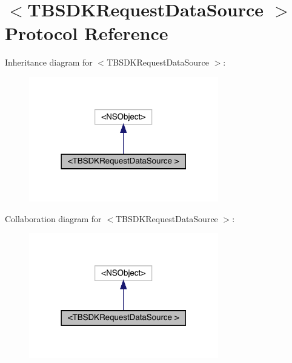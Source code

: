 \hypertarget{protocol_t_b_s_d_k_request_data_source_01-p}{}\section{$<$T\+B\+S\+D\+K\+Request\+Data\+Source $>$ Protocol Reference}
\label{protocol_t_b_s_d_k_request_data_source_01-p}


Inheritance diagram for $<$T\+B\+S\+D\+K\+Request\+Data\+Source $>$\+:\nopagebreak
\begin{figure}[H]
\begin{center}
\leavevmode
\includegraphics[width=234pt]{protocol_t_b_s_d_k_request_data_source_01-p__inherit__graph}
\end{center}
\end{figure}


Collaboration diagram for $<$T\+B\+S\+D\+K\+Request\+Data\+Source $>$\+:\nopagebreak
\begin{figure}[H]
\begin{center}
\leavevmode
\includegraphics[width=234pt]{protocol_t_b_s_d_k_request_data_source_01-p__coll__graph}
\end{center}
\end{figure}
